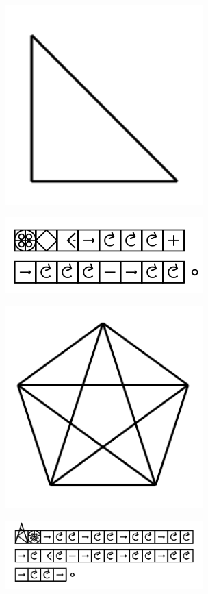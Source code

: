\documentclass[11pt]{article}
\begin{document}
\includegraphics[width=3in]{image14.png}

\includegraphics[width=3in]{image15.png}





\includegraphics[width=3in]{image16.png}

\includegraphics[width=3in]{image17.png}
\end{document}
